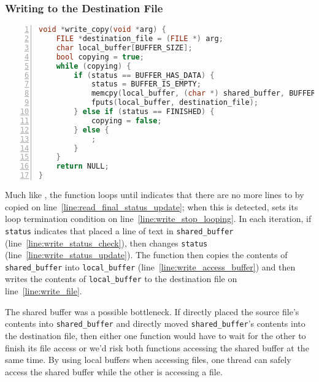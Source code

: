    \newpage
    \subsubsection{Writing to the Destination File}\label{subsubsec:understandWriter}

    \renewcommand*\thelstnumber{\Alph{lstnumber}}
%    
\begin{lstlisting}[language=c, numbers=left, escapechar=`]
void *write_copy(void *arg) {
    FILE *destination_file = (FILE *) arg;
    char local_buffer[BUFFER_SIZE];
    bool copying = true;                                                    `\label{line:write_before_while}`
    while (copying) {                                                       `\label{line:write_while}`
        if (status == BUFFER_HAS_DATA) {                                    `\label{line:write_status_check}`
            status = BUFFER_IS_EMPTY;                                       `\label{line:write_status_update}`
            memcpy(local_buffer, (char *) shared_buffer, BUFFER_SIZE);      `\label{line:write_access_buffer}`
            fputs(local_buffer, destination_file);                          `\label{line:write_file}`
        } else if (status == FINISHED) {
            copying = false;                                                `\label{line:write_stop_looping}`
        } else {
            ;
        }
    }
    return NULL;
}
\end{lstlisting}

    Much like , the  function loops until  indicates that there are no more lines to by copied on line~\ref{line:read_final_status_update};
    when this is detected,  sets its loop termination condition on line~\ref{line:write_stop_looping}.
    In each iteration, if \lstinline{status} indicates that  placed a line of text in \lstinline{shared_buffer} (line~\ref{line:write_status_check}), then  changes \lstinline{status} (line~\ref{line:write_status_update}).
    The function then copies the contents of \lstinline{shared_buffer} into \lstinline{local_buffer} (line~\ref{line:write_access_buffer}) and then writes the contents of \lstinline{local_buffer} to the destination file on line~\ref{line:write_file}.

    The shared buffer was a possible bottleneck.
    If  directly placed the source file's contents into \lstinline{shared_buffer} and  directly moved \lstinline{shared_buffer}'s contents into the destination file, then either one function would have to wait for the other to finish its file access or we'd risk both functions accessing the shared buffer at the same time.
    By using local buffers when accessing files, one thread can safely access the shared buffer while the other is accessing a file.

